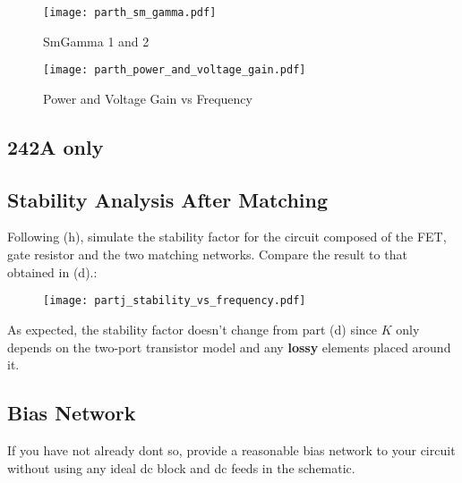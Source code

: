 \begin{figure}[H]
    \texttt{[image: parth\_sm\_gamma.pdf]}
    \caption{SmGamma 1 and 2}
    \endminipage\hfill
    \texttt{[image: parth\_power\_and\_voltage\_gain.pdf]}
    \caption{Power and Voltage Gain vs Frequency}
    \endminipage
\end{figure}

\subsection{242A only}

\subsection{Stability Analysis After Matching}
{\color{blue} Following (h), simulate the stability factor for the circuit composed of the FET, gate resistor and the two matching networks. Compare the result to that obtained in (d).}:

\begin{figure}[H]
    \centering \texttt{[image: partj\_stability\_vs\_frequency.pdf]}
\end{figure}

As expected, the stability factor doesn't change from part (d) since $K$ only depends on the two-port transistor model and any \textbf{lossy} elements placed around it.

\subsection{Bias Network}
{\color{blue} If you have not already dont so, provide a reasonable bias network to your circuit without using any ideal dc block and dc feeds in the schematic.}


